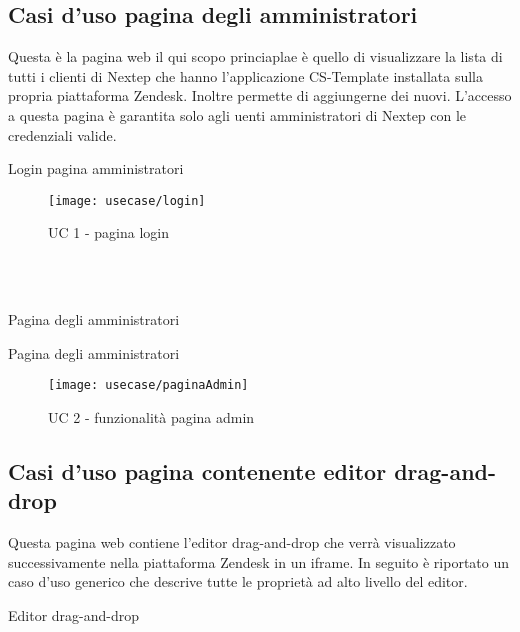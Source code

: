 \subsection{ Casi d'uso pagina degli amministratori}
Questa è la pagina web il qui scopo princiaplae è quello di visualizzare la lista di tutti i clienti di Nextep che hanno l'applicazione CS-Template installata sulla propria piattaforma Zendesk. Inoltre permette di aggiungerne dei nuovi. L'accesso a questa pagina è garantita solo agli uenti amministratori di Nextep con le credenziali valide.
\begin{usecase}{1}{Login pagina amministratori}

		\begin{figure}[!h] 
		\centering 
		\texttt{[image: usecase/login]} 
		\caption{UC 1 - pagina login}
	\end{figure}
\\ 
\\
\begin{usecase}{2}{Pagina degli amministratori}

\begin{usecase}{2}{Pagina degli amministratori}
	
	\begin{figure}[!h] 
		\centering 
		\texttt{[image: usecase/paginaAdmin]} 
		\caption{UC 2 - funzionalità pagina admin}
	\end{figure}
\end{usecase}

\subsection{ Casi d'uso pagina contenente editor drag-and-drop}
Questa pagina web contiene l'editor drag-and-drop che verrà visualizzato successivamente nella piattaforma Zendesk in un iframe. In seguito è riportato un caso d'uso generico che descrive tutte le proprietà ad alto livello del editor.
\begin{usecase}{3}{Editor drag-and-drop}
	

\end{usecase}
\end{usecase}
\end{usecase}
